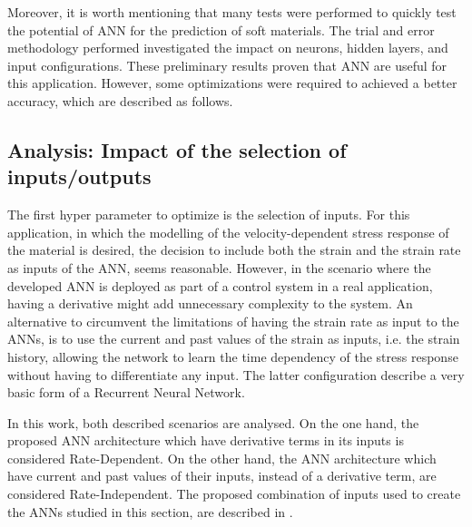 Moreover, it is worth mentioning that many tests were performed to quickly test the potential of ANN for the prediction of soft materials. The trial and error methodology performed investigated the impact on neurons, hidden layers, and input configurations. These preliminary results proven that ANN are useful for this application. However, some optimizations were required to achieved a better accuracy, which are described as follows.

\subsection{Analysis: Impact of the selection of inputs/outputs}

The first hyper parameter to optimize is the selection of inputs. For this application, in which the modelling of the velocity-dependent stress response of the material is desired, the decision to include both the strain and the strain rate as inputs of the ANN, seems reasonable. However, in the scenario where the developed ANN is deployed as part of a control system in a real application, having a derivative might add unnecessary complexity to the system. An alternative to circumvent the limitations of having the strain rate as input to the ANNs, is to use the current and past values of the strain as inputs, i.e. the strain history, allowing the network to learn the time dependency of the stress response without having to differentiate any input. The latter configuration describe a very basic form of a Recurrent Neural Network. 

In this work, both described scenarios are analysed. On the one hand, the proposed ANN architecture which have derivative terms in its inputs is considered Rate-Dependent. On the other hand, the ANN architecture which have current and past values of their inputs, instead of a derivative term, are considered Rate-Independent. The proposed combination of inputs used to create the ANNs studied in this section, are described in .

